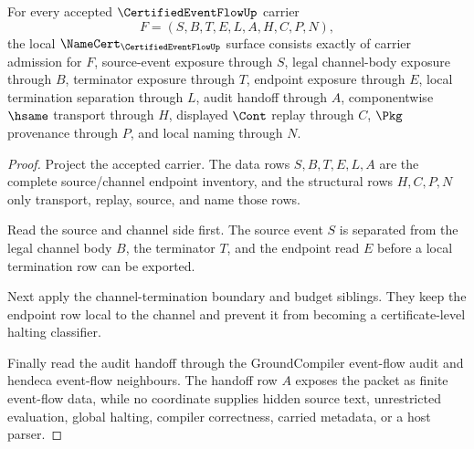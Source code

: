 \begin{theorem}
\label{thm:certified-event-flow-namecert-obligations}
For every accepted $\CertifiedEventFlowUp$ carrier
$$
F=(S,B,T,E,L,A,H,C,P,N),
$$
the local $\NameCert_{\CertifiedEventFlowUp}$ surface consists exactly of carrier admission for $F$, source-event exposure through $S$, legal channel-body exposure through $B$, terminator exposure through $T$, endpoint exposure through $E$, local termination separation through $L$, audit handoff through $A$, componentwise $\hsame$ transport through $H$, displayed $\Cont$ replay through $C$, $\Pkg$ provenance through $P$, and local naming through $N$.
\end{theorem}
\begin{proof}
Project the accepted carrier. The data rows $S,B,T,E,L,A$ are the complete source/channel endpoint inventory, and the structural rows $H,C,P,N$ only transport, replay, source, and name those rows.

Read the source and channel side first. The source event $S$ is separated from the legal channel body $B$, the terminator $T$, and the endpoint read $E$ before a local termination row can be exported.

Next apply the channel-termination boundary and budget siblings. They keep the endpoint row local to the channel and prevent it from becoming a certificate-level halting classifier.

Finally read the audit handoff through the GroundCompiler event-flow audit and hendeca event-flow neighbours. The handoff row $A$ exposes the packet as finite event-flow data, while no coordinate supplies hidden source text, unrestricted evaluation, global halting, compiler correctness, carried metadata, or a host parser.
\end{proof}

